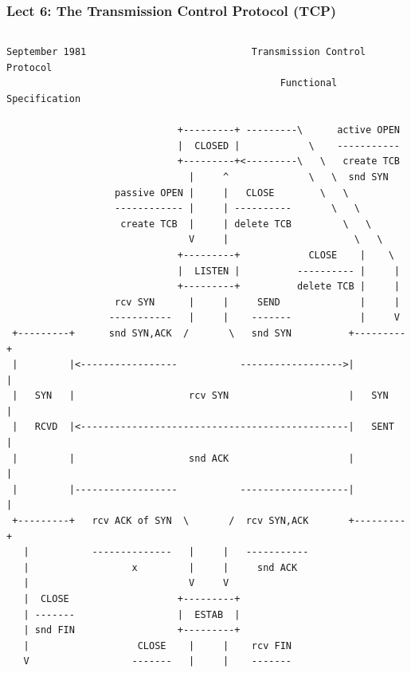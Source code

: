\begin{frame}[fragile]
  \frametitle{Lect 6: The Transmission Control Protocol (TCP)}

  \begin{columns}[T]

  \begin{Tiny}
    \begin{verbatim}
September 1981                             Transmission Control Protocol
                                                Functional Specification

                              +---------+ ---------\      active OPEN  
                              |  CLOSED |            \    -----------  
                              +---------+<---------\   \   create TCB  
                                |     ^              \   \  snd SYN    
                   passive OPEN |     |   CLOSE        \   \           
                   ------------ |     | ----------       \   \         
                    create TCB  |     | delete TCB         \   \       
                                V     |                      \   \     
                              +---------+            CLOSE    |    \   
                              |  LISTEN |          ---------- |     |  
                              +---------+          delete TCB |     |  
                   rcv SYN      |     |     SEND              |     |  
                  -----------   |     |    -------            |     V  
 +---------+      snd SYN,ACK  /       \   snd SYN          +---------+
 |         |<-----------------           ------------------>|         |
 |   SYN   |                    rcv SYN                     |   SYN   |
 |   RCVD  |<-----------------------------------------------|   SENT  |
 |         |                    snd ACK                     |         |
 |         |------------------           -------------------|         |
 +---------+   rcv ACK of SYN  \       /  rcv SYN,ACK       +---------+
   |           --------------   |     |   -----------                  
   |                  x         |     |     snd ACK                    
   |                            V     V                                
   |  CLOSE                   +---------+                              
   | -------                  |  ESTAB  |                              
   | snd FIN                  +---------+                              
   |                   CLOSE    |     |    rcv FIN                     
   V                  -------   |     |    -------                     

\end{verbatim}
\end{Tiny}
\end{columns}
\end{frame}
